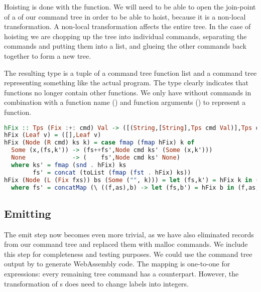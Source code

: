 Hoisting is done with the  function. We will need to be able to open the join-point of a  of our command tree in order to be able to hoist, because it is a non-local transformation. A non-local transformation affects the entire tree. In the case of hoisting we are chopping up the tree into individual commands, separating the  commands and putting them into a list, and glueing the other commands back together to form a new tree.

The resulting type is a tuple of a command tree function list and a command tree representing something like the actual program. The type clearly indicates that functions no longer contain other functions. We only have  without  commands in combination with a function name () and function arguments (\icode{[String]}) to represent a function.

\begin{lstlisting}[language=Haskell]
hFix :: Tps (Fix :+: cmd) Val -> ([(String,[String],Tps cmd Val)],Tps cmd Val)
hFix (Leaf v) = ([],Leaf v)
hFix (Node (R cmd) ks k) = case fmap (fmap hFix) k of
  Some (x,(fs,k')) -> (fs++fs',Node cmd ks' (Some (x,k')))
  None             -> (    fs',Node cmd ks' None)
  where ks' = fmap (snd . hFix) ks
        fs' = concat (toList (fmap (fst . hFix) ks))
hFix (Node (L (Fix fxs)) bs (Some ("", k))) = let (fs,k') = hFix k in (fs'++fs,k')
  where fs' = concatMap (\ ((f,as),b) -> let (fs,b') = hFix b in (f,as,b') : fs) (zip (toList fxs) (toList bs))
\end{lstlisting}

\subsection{\label{subsection:emit2}Emitting}
The emit step now becomes even more trivial, as we have also eliminated records from our command tree and replaced them with malloc commands. We include this step for completeness and testing purposes. We could use the command tree output by  to generate WebAssembly code. The mapping is one-to-one for expressions: every remaining tree command has a  counterpart. However, the transformation of s does need to change labels into integers.

